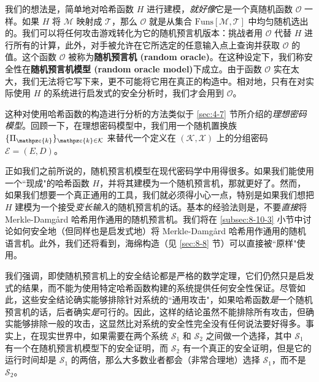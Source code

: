 我们的想法是，简单地对哈希函数 $H$ 进行建模，\emph{就好像}它是一个真随机函数 $\mathcal{O}$ 一样。如果 $H$ 将 $\mathcal{M}$ 映射成 $\mathcal{T}$，那么 $\mathcal{O}$ 就是从集合 $\mathrm{Funs}[\mathcal{M},\mathcal{T}]$ 中均匀随机选出的。我们可以将任何攻击游戏转化为它的随机预言机版本：挑战者用 $\mathcal{O}$ 代替 $H$ 进行所有的计算，此外，对手被允许在它所选定的任意输入点上查询并获取 $\mathcal{O}$ 的值。这个函数 $\mathcal{O}$ 被称为\textbf{随机预言机 (random oracle)}。在这种设定下，我们称安全性在\textbf{随机预言机模型 (random oracle model)}下成立。由于函数 $\mathcal{O}$ 实在太大，我们无法将它写下来，更不可能将它用在真正的构造中。相对地，只有在对实际使用 $H$ 的系统进行启发式的安全分析时，我们才会用到 $\mathcal{O}$。

这种对使用哈希函数的构造进行分析的方法类似于 \ref{sec:4-7} 节所介绍的\emph{理想密码模型}。回顾一下，在理想密码模型中，我们用一个随机置换族 $\{\Pi_\mathpzc{k}\}_{\mathpzc{k}\in\mathcal{K}}$ 来替代一个定义在 $(\mathcal{K},\mathcal{X})$ 上的分组密码 $\mathcal{E}=(E,D)$。

正如我们之前所说的，随机预言机模型在现代密码学中用得很多。如果我们能使用一个``现成"的哈希函数 $H$，并将其建模为一个随机预言机，那就更好了。然而，如果我们想要一个真正通用的工具，我们就必须得小心一点，特别是如果我们想把 $H$ 建模为一个接受\emph{变长输入}的随机预言机的话。基本的经验法则是，不要\emph{直接}将 Merkle-Damg{\aa}rd 哈希用作通用的随机预言机。我们将在 \ref{subsec:8-10-3} 小节中讨论如何安全地（但同样也是启发式地）将 Merkle-Damg{\aa}rd 哈希用作通用的随机语言机。此外，我们还将看到，海绵构造（见 \ref{sec:8-8} 节）可以直接被``原样"使用。

我们强调，即使随机预言机上的安全结论都是严格的数学定理，它们仍然只是启发式的结果，而不能为使用特定哈希函数构建的系统提供任何安全性保证。尽管如此，这些安全结论确实能够排除针对系统的``通用攻击"，如果哈希函数\emph{是}一个随机预言机的话，后者确实\emph{是}可行的。因此，这样的结论虽然不能排除所有攻击，但确实能够排除一般的攻击，这显然比对系统的安全性完全没有任何说法要好得多。事实上，在现实世界中，如果需要在两个系统 $\mathcal{S}_1$ 和 $\mathcal{S}_2$ 之间做一个选择，其中 $\mathcal{S}_1$ 有一个在随机预言机模型下的安全证明，而 $\mathcal{S}_2$ 有一个真正的安全证明，但是它的运行时间却是 $\mathcal{S}_1$ 的两倍，那么大多数业者都会（非常合理地）选择 $\mathcal{S}_1$，而不是 $\mathcal{S}_2$。

